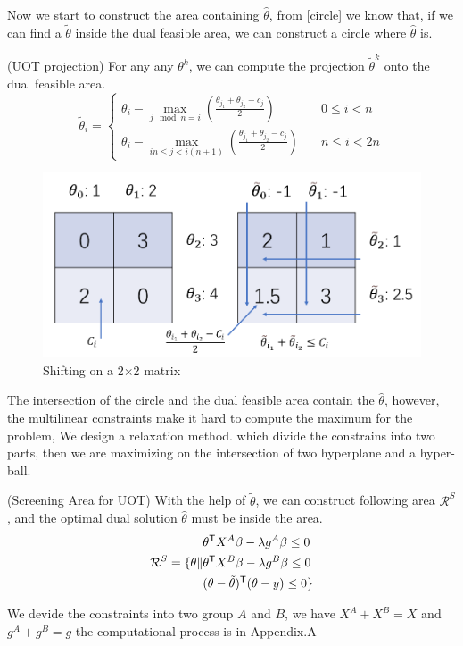 Now we start to construct the area containing $\hat{\theta}$, from \ref{circle} we know that, if we can find a $\tilde{\theta}$ inside the dual feasible area, we can construct a circle where $\hat{\theta}$ is.  
\begin{thm}
(UOT projection) For any any $\theta^k$, we can compute the projection $\tilde{\theta}^k$ onto the dual feasible area.
 \begin{equation}
		\tilde{\theta}_{i}=\left\{
	\begin{aligned}
			\theta_{i} - \max_{j \mod n =i}(\frac{\theta_{j_{1}}+\theta_{j_{2}}-c_j}{2}) &\quad 0\leq i<n\\
			\theta_{i} - \max_{in\leq j <i(n+1)}(\frac{\theta_{j_{1}}+\theta_{j_{2}}-c_j}{2}) & \quad n\leq i<2n
	\end{aligned}
	\right.
 \end{equation}
\end{thm}
	\begin{figure}[htbp]
	\begin{center}	
	\includegraphics[width=0.8\hsize]{pic/shifting}
	\caption{Shifting on a 2$\times$2 matrix}
	\end{center}	
	\end{figure}

The intersection of the circle and the dual feasible area contain the $\hat{\theta}$, however, the multilinear constraints make it hard to compute the maximum for the problem, We design a relaxation method. which divide the constrains into two parts, then we are maximizing on the intersection of two hyperplane and a hyper-ball. 

\begin{thm}\label{area}(Screening Area for UOT) With the help of $\tilde{\theta}$, we can construct following area $\mathcal{R}^{S}$, and the optimal dual solution $\hat{\theta}$ must be inside the area.
 \begin{equation}
\begin{split} 
\mathcal{R}^S = \{ \theta \|
\begin{aligned}
 &\theta^{\mathsf T}X^A\beta - \lambda g^{A}\beta\leq 0 \\
  &\theta^{\mathsf T}X^B\beta - \lambda g^{B}\beta \leq 0\\
   &(\theta-\tilde{\theta})^{\mathsf T}(\theta-y)\leq 0\}
\end{aligned}
\end{split}
\label{eq:divide}
\end{equation}
\end{thm}
We devide the constraints into two group $A$ and $B$, we have $X^A +X^B=X$ and $g^A+g^B = g$
the computational process is in Appendix.A


